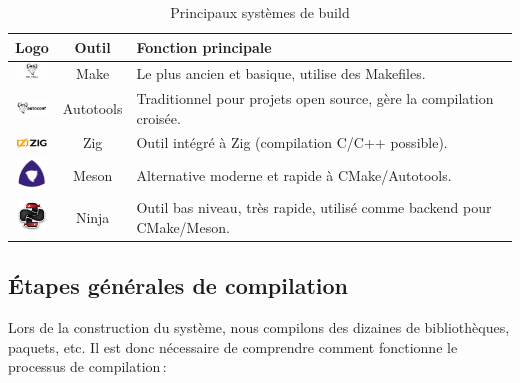 \begin{table}[H]
    \centering
    \begin{tabular}{|c|c|p{8cm}|}
        \hline
        \textbf{Logo} & \textbf{Outil} & \textbf{Fonction principale} \\
        \hline
        \includegraphics[width=0.8cm]{images_pfe/make.png} & Make & Le plus ancien et basique, utilise des Makefiles. \\
        \hline
        \includegraphics[width=0.8cm]{images_pfe/GNU-Autoconf-768x288.jpg} & Autotools & Traditionnel pour projets open source, gère la compilation croisée. \\
        \hline
        \includegraphics[width=0.8cm]{images_pfe/zig.png} & Zig & Outil intégré à Zig (compilation C/C++ possible). \\
        \hline
        \includegraphics[width=0.8cm]{images_pfe/meson_logo.png} & Meson & Alternative moderne et rapide à CMake/Autotools. \\
        \hline
        \includegraphics[width=0.8cm]{images_pfe/ninja.jpeg} & Ninja & Outil bas niveau, très rapide, utilisé comme backend pour CMake/Meson. \\
        \hline
    \end{tabular}
    \caption{Principaux systèmes de build}
    \label{tab:build_tools_logos}
\end{table}


\subsection{Étapes générales de compilation}
\label{sssec:etapes-compilation}

Lors de la construction du système, nous compilons des dizaines de bibliothèques, paquets, etc. Il est donc nécessaire de comprendre comment fonctionne le processus de compilation :

